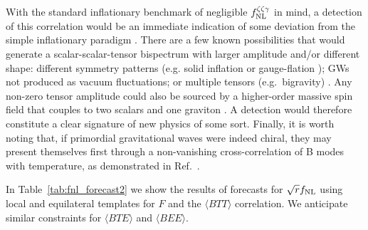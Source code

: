 %

With the standard inflationary benchmark of negligible $f^{\zeta \zeta\gamma }_{\rm NL}$ in mind, a detection of this correlation would be an immediate indication of some deviation from the simple inflationary paradigm \cite{Bordin:2016ruc,Dimastrogiovanni:2015pla}. There are a few known possibilities that would generate a scalar-scalar-tensor bispectrum with larger amplitude and/or different shape: different symmetry patterns (e.g. solid inflation \cite{Endlich:2012pz} or gauge-flation \cite{Maleknejad:2011jw, Adshead:2016iix}); GWs not produced as vacuum fluctuations; or multiple tensors (e.g.\ bigravity) \cite{Bordin:2016ruc}. Any non-zero tensor amplitude could also be sourced by a higher-order massive spin field that couples to two scalars and one graviton \cite{Dimastrogiovanni:2015pla}. A detection would therefore constitute a clear signature of new physics of some sort. Finally, it is worth noting that, if primordial gravitational waves were indeed chiral, they may present themselves first through a non-vanishing cross-correlation of B modes with temperature, as demonstrated in Ref.~\cite{Contaldi:2008yz}.

In Table~\ref{tab:fnl_forecast2} we show the results of forecasts for $\sqrt{r}f_{\rm NL}$ using local and equilateral templates for $F$ and the $\langle BTT\rangle$ correlation. We anticipate similar constraints for $\langle BTE\rangle $ and $\langle BEE\rangle$. 

